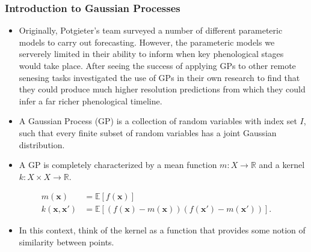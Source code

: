 \documentclass[9pt,hyperref={pdfpagelabels=false},xcolor=table]{beamer}
\begin{document}
\begin{frame}
    \frametitle{Introduction to Gaussian Processes}
    \begin{itemize}
        \item Originally, Potgieter's team surveyed a number of different parameteric models to carry out forecasting. However, the parameteric models we serverely limited in their ability to inform when key phenological stages would take place. After seeing the success of applying GPs to other remote senesing tasks investigated the use of GPs in their own research to find that they could produce much higher resolution predictions from which they could infer a far richer phenological timeline.
        \item A Gaussian Process (GP) is a collection of random variables with index set $I$, such that every finite subset of random variables has a joint Gaussian distribution.
        \item A GP is completely characterized by a mean function $m : X \to \mathbb{R}$ and a kernel $k : X \times X \to \mathbb{R}$.
    \end{itemize}
    \begin{align*}
        m(\bm{x})           & = \mathbb{E} \left[ f(\bm{x}) \right]                                          \\
        k (\bm{x}, \bm{x'}) & = \mathbb{E} \left[ (f(\bm{x}) - m(\bm{x})) (f(\bm{x'}) - m(\bm{x'})) \right].
    \end{align*}
    \begin{itemize}
        \item In this context, think of the kernel as a function that provides some notion of similarity between points.
    \end{itemize}
\end{frame}
\end{document}
